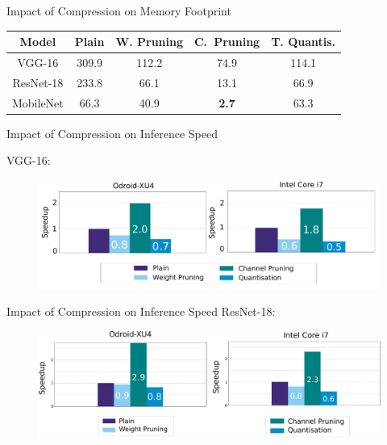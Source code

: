 \documentclass[xcolor=dvipsnames]{beamer}
\begin{document}
\begin{frame}{Impact of Compression on Memory Footprint}
    
\begin{table}[h]
\begin{center}

\begin{tabular}{ |c|c|c|c|c| } \hline
Model&Plain&W. Pruning &C.~Pruning&T. Quantis.\\ \hline \hline
VGG-16 	  &	309.9	& 112.2	& 74.9	& 114.1 \\ \hline
ResNet-18 &	233.8	& 66.1	& 13.1	& 66.9 \\ \hline
MobileNet & 66.3 & 40.9	& {\color{red}\textbf{2.7}}	& 63.3 \\ \hline
\end{tabular}
\label{table:mem-90}
\end{center}
\end{table}

\end{frame}


\begin{frame}{Impact of Compression on Inference Speed}
    
    VGG-16:
    
    \begin{figure}
        \centering
        \includegraphics[width=\linewidth]{images/vgg_speedup.pdf}
    \end{figure}
\end{frame}


\begin{frame}{Impact of Compression on Inference Speed}
ResNet-18:
\begin{figure}
    \centering
    \includegraphics[width=\linewidth]{images/resnet_speedup.pdf}
\end{figure}
\end{frame}
\end{document}
